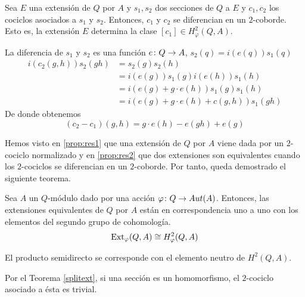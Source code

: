 \begin{proposicion}\label{prop:res2}
	Sea $E$ una extensión de $Q$ por $A$ y $s_1,s_2$ dos secciones de $Q$ a $E$ y $c_1,c_2$ los cociclos asociados a $s_1$ y $s_2$. Entonces, $c_1$ y $c_2$ se diferencian en un $2$-coborde. Esto es, la extensión $E$ determina la clase $[c_1]\in H^2_\varphi(Q,A)$.
	
	\begin{demostracion}
		La diferencia de $s_1$ y $s_2$ es una función $e\colon Q\to A$, $s_2(q) = i(e(q))s_1(q)$ %
		\begin{align*}
			i(c_2(g,h))s_2(gh) &= s_2(g)s_2(h) \\ &= i(e(g))s_1(g)i(e(h))s_1(h)\\ &= i(e(g) + g \cdot e(h)) s_1(g)s_1(h) \\ &= i(e(g) + g \cdot e(h) + c(g,h))s_1(gh)
		\end{align*}
		De donde obtenemos
		\begin{equation} 
			(c_2-c_1)(g,h) = g \cdot e(h) - e(gh) + e(g)
		\end{equation}
	\end{demostracion}
\end{proposicion}

Hemos visto en \ref{prop:res1} que una extensión de $Q$ por $A$ viene dada por un $2$-cociclo normalizado y en \ref{prop:res2} que dos extensiones son equivalentes cuando los $2$-cociclos se diferencian en un $2$-coborde. Por tanto, queda demostrado el siguiente teorema.

\begin{teorema}\label{h2}
	Sea $A$ un $Q$-módulo dado por una acción $\varphi\colon Q\to Aut(A)$. Entonces, las extensiones equivalentes de $Q$ por $A$ están en correspondencia uno a uno con los elementos del segundo grupo de cohomología.
	\begin{equation*}
		\operatorname{Ext}_{\varphi}(Q,A)\cong H^2_{\varphi}(Q,A)
	\end{equation*}
\end{teorema}

\begin{observacion}\label{obs:split}
	El producto semidirecto se corresponde con el elemento neutro de $H^2(Q,A)$.
	\begin{demostracion}
		Por el Teorema \ref{splitext}, si una sección es un homomorfismo, el $2$-cociclo asociado a ésta es trivial.
	\end{demostracion}
\end{observacion}



